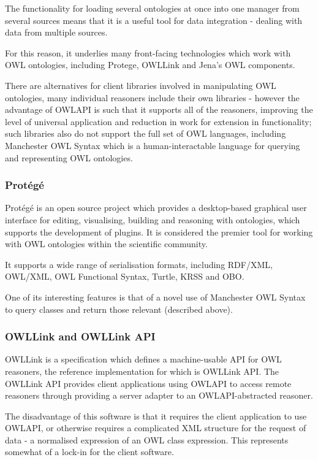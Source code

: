 \documentclass{article}
\begin{document}
The functionality for loading several ontologies at once into one manager from
several sources means that it is a useful tool for data integration - dealing
with data from multiple sources.

For this reason, it underlies many front-facing technologies which work with OWL
ontologies, including Protege, OWLLink and Jena's OWL components.

There are alternatives for client libraries involved in manipulating OWL
ontologies, many individual reasoners include their own libraries - however the
advantage of OWLAPI is such that it supports all of the reasoners, improving
the level of universal application and reduction in work for extension in
functionality; such libraries also do not support the full set of OWL languages,
including Manchester OWL Syntax which is a human-interactable language for
querying and representing OWL ontologies.

\subsubsection{Protégé}

Protégé is an open source project which provides a desktop-based graphical user
interface for editing, visualising, building and reasoning with ontologies, which supports
the development of plugins. It is considered the premier tool for working with
OWL ontologies within the scientific community.

It supports a wide range of serialisation formats, including RDF/XML, OWL/XML,
OWL Functional Syntax, Turtle, KRSS and OBO.

One of its interesting features is that of a novel use of Manchester OWL Syntax
to query classes and return those relevant (described above).

\subsubsection{OWLLink and OWLLink API}

OWLLink is a specification which defines a machine-usable API for OWL reasoners,
the reference implementation for which is OWLLink API. The OWLLink API provides
client applications using OWLAPI to access remote reasoners through providing a
server adapter to an OWLAPI-abstracted reasoner. 

The disadvantage of this software is that it requires the client application
to use OWLAPI, or otherwise requires a complicated XML structure for the
request of data - a normalised expression of an OWL class expression. This
represents somewhat of a lock-in for the client software. 
\end{document}
